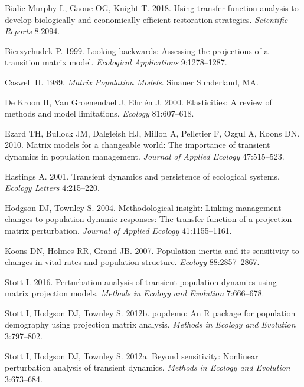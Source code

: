 \documentclass[
  12pt,
  letterpaper,
]{book}
\newlength{\cslhangindent}
\newenvironment{CSLReferences}[2] %
 {\begin{list}{}{%
  \setlength{\itemindent}{0pt}
  \setlength{\leftmargin}{0pt}
  \setlength{\parsep}{0pt}
  \ifodd #1
   \setlength{\leftmargin}{\cslhangindent}
   \setlength{\itemindent}{-1\cslhangindent}
  \fi
  \setlength{\itemsep}{#2\baselineskip}}}
 {\end{list}}
\begin{document}
\label{refs}
\begin{CSLReferences}{1}{0}
Bialic-Murphy L, Gaoue OG, Knight T. 2018. Using transfer function
analysis to develop biologically and economically efficient restoration
strategies. \emph{Scientific Reports} 8:2094.

Bierzychudek P. 1999. Looking backwards: Assessing the projections of a
transition matrix model. \emph{Ecological Applications} 9:1278--1287.

Caswell H. 1989. \emph{Matrix {P}opulation {M}odels}. Sinauer
Sunderland, MA.

De Kroon H, Van Groenendael J, Ehrlén J. 2000. Elasticities: A review of
methods and model limitations. \emph{Ecology} 81:607--618.

Ezard TH, Bullock JM, Dalgleish HJ, Millon A, Pelletier F, Ozgul A,
Koons DN. 2010. Matrix models for a changeable world: The importance of
transient dynamics in population management. \emph{Journal of Applied
Ecology} 47:515--523.

Hastings A. 2001. Transient dynamics and persistence of ecological
systems. \emph{Ecology Letters} 4:215--220.

Hodgson DJ, Townley S. 2004. Methodological insight: Linking management
changes to population dynamic responses: The transfer function of a
projection matrix perturbation. \emph{Journal of Applied Ecology}
41:1155--1161.

Koons DN, Holmes RR, Grand JB. 2007. Population inertia and its
sensitivity to changes in vital rates and population structure.
\emph{Ecology} 88:2857--2867.

Stott I. 2016. Perturbation analysis of transient population dynamics
using matrix projection models. \emph{Methods in Ecology and Evolution}
7:666--678.

Stott I, Hodgson DJ, Townley S. 2012b. {p}opdemo: An {R} package for
population demography using projection matrix analysis. \emph{Methods in
Ecology and Evolution} 3:797--802.

Stott I, Hodgson DJ, Townley S. 2012a. Beyond sensitivity: Nonlinear
perturbation analysis of transient dynamics. \emph{Methods in Ecology
and Evolution} 3:673--684.


\end{CSLReferences}
\end{document}
